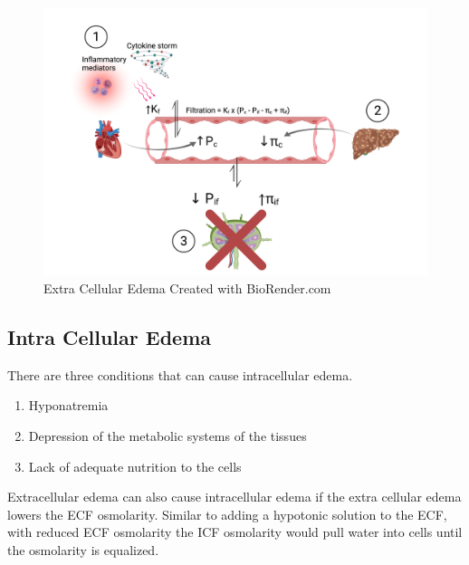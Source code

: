 \begin{figure}[!h]
    \centering
    \includegraphics[width=1\linewidth]{./figure/Extracellular_Edema.png}
    \caption{Extra Cellular Edema \footnotesize{Created with BioRender.com}}
    \label{fig:Extracellular_Edema}
\end{figure}

\subsection{Intra Cellular Edema}

There are three conditions that can cause intracellular edema.
\begin{enumerate}
    \item Hyponatremia
    \item Depression of the metabolic systems of the tissues
    \item Lack of adequate nutrition to the cells
\end{enumerate}

Extracellular edema can also cause intracellular edema if the extra cellular edema lowers the ECF osmolarity. Similar to adding a hypotonic solution to the ECF, with reduced ECF osmolarity the ICF osmolarity would pull water into cells until the osmolarity is equalized.

